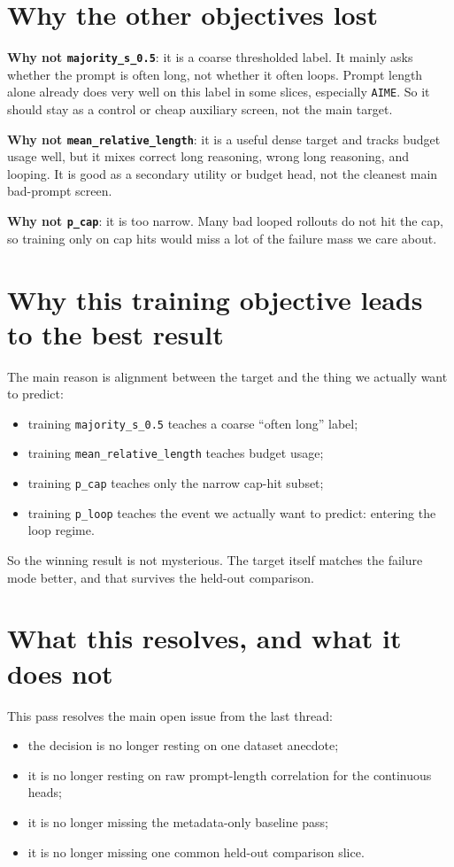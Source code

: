 \documentclass[11pt]{article}
\begin{document}
\section*{Why the other objectives lost}
\textbf{Why not \texttt{majority\_s\_0.5}}: it is a coarse thresholded label. It
mainly asks whether the prompt is often long, not whether it often loops.
Prompt length alone already does very well on this label in some slices,
especially \texttt{AIME}. So it should stay as a control or cheap auxiliary
screen, not the main target.

\textbf{Why not \texttt{mean\_relative\_length}}: it is a useful dense target and
tracks budget usage well, but it mixes correct long reasoning, wrong long
reasoning, and looping. It is good as a secondary utility or budget head, not
the cleanest main bad-prompt screen.

\textbf{Why not \texttt{p\_cap}}: it is too narrow. Many bad looped rollouts do
not hit the cap, so training only on cap hits would miss a lot of the failure
mass we care about.

\section*{Why this training objective leads to the best result}
The main reason is alignment between the target and the thing we actually want
to predict:
\begin{itemize}[leftmargin=1.5em]
\item training \texttt{majority\_s\_0.5} teaches a coarse ``often long'' label;
\item training \texttt{mean\_relative\_length} teaches budget usage;
\item training \texttt{p\_cap} teaches only the narrow cap-hit subset;
\item training \texttt{p\_loop} teaches the event we actually want to predict:
entering the loop regime.
\end{itemize}

So the winning result is not mysterious. The target itself matches the failure
mode better, and that survives the held-out comparison.

\section*{What this resolves, and what it does not}
This pass resolves the main open issue from the last thread:
\begin{itemize}[leftmargin=1.5em]
\item the decision is no longer resting on one dataset anecdote;
\item it is no longer resting on raw prompt-length correlation for the
continuous heads;
\item it is no longer missing the metadata-only baseline pass;
\item it is no longer missing one common held-out comparison slice.
\end{itemize}
\end{document}
